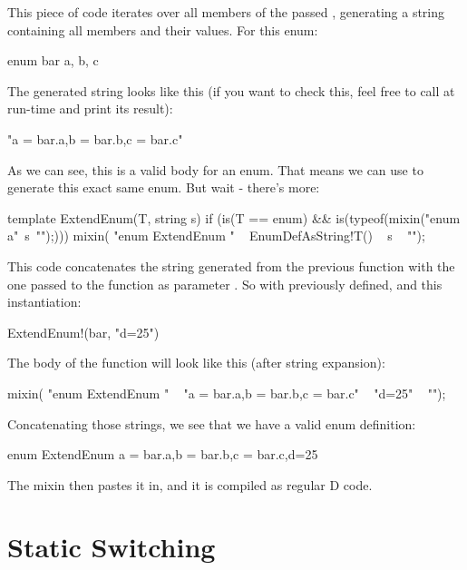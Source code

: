 This piece of code iterates over all members of the passed ,
generating a string containing all members and their values. For
this enum:

\begin{dcode}
enum bar
{
    a, b, c
}
\end{dcode}

The generated string looks like this (if you want to check this,
feel free to call  at run-time and print its result):

\begin{dcode}
"a = bar.a,b = bar.b,c = bar.c"
\end{dcode}

As we can see, this is a valid body for an enum. That means we can use
\DD{()} to generate this exact same enum. But wait - there's more:

\begin{dcode}
template ExtendEnum(T, string s)
   if (is(T == enum) &&
   is(typeof({mixin("enum a{"~s~"}");})))
{
   mixin(
   "enum ExtendEnum {"
   ~ EnumDefAsString!T()
   ~ s
   ~ "}");
}
\end{dcode}

This code concatenates the string generated from the previous function
with the one passed to the function as parameter . So with  previously defined, and this instantiation:

\begin{dcode}
ExtendEnum!(bar, "d=25")
\end{dcode}

The body of the function will look like this (after string expansion):

\begin{dcode}
mixin(
   "enum ExtendEnum {"
   ~ "a = bar.a,b = bar.b,c = bar.c"
   ~ "d=25"
   ~ "}");
\end{dcode}

Concatenating those strings, we see that we have a valid enum definition:

\begin{dcode}
enum ExtendEnum {a = bar.a,b = bar.b,c = bar.c,d=25}
\end{dcode}

The mixin then pastes it in, and it is compiled as regular D code.

\section{Static Switching} \label{examples:staticswitch}

